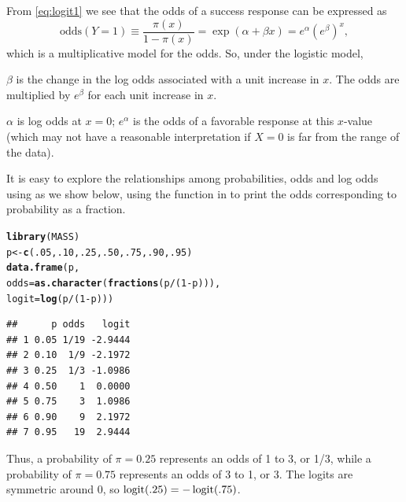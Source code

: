 \documentclass[11pt]{book}\usepackage[]{graphicx}\usepackage[]{color}
\makeatletter
\newcommand{\hlnum}[1]{\textcolor[rgb]{0.686,0.059,0.569}{#1}}%
\newcommand{\hlopt}[1]{\textcolor[rgb]{0,0,0}{#1}}%
\newcommand{\hlstd}[1]{\textcolor[rgb]{0.345,0.345,0.345}{#1}}%
\newcommand{\hlkwb}[1]{\textcolor[rgb]{0.69,0.353,0.396}{#1}}%
\newcommand{\hlkwc}[1]{\textcolor[rgb]{0.333,0.667,0.333}{#1}}%
\newcommand{\hlkwd}[1]{\textcolor[rgb]{0.737,0.353,0.396}{\textbf{#1}}}%
\newenvironment{kframe}{%
 \def\at@end@of@kframe{}%
 \ifinner\ifhmode%
  \def\at@end@of@kframe{\end{minipage}}%
  \begin{minipage}{\columnwidth}%
 \fi\fi%
 \def\FrameCommand##1{\hskip\@totalleftmargin \hskip-\fboxsep
 \colorbox{shadecolor}{##1}\hskip-\fboxsep
     \hskip-\linewidth \hskip-\@totalleftmargin \hskip\columnwidth}%
 \MakeFramed {\advance\hsize-\width
   \@totalleftmargin\z@ \linewidth\hsize
   \@setminipage}}%
 {\par\unskip\endMakeFramed%
 \at@end@of@kframe}
\newenvironment{knitrout}{}{} %
\renewenvironment{knitrout}{\small\renewcommand{\baselinestretch}{.85}}{} %
\makeatother
\begin{document}
From \eqref{eq:logit1} we see that the odds of a success response
can be expressed as
%
\begin{equation}\label{eq:logit2}
\mbox{odds}(Y=1) \equiv \frac{\pi(x) }{1-\pi(x) }  =
\exp (\alpha + \beta x) = e^{\alpha} ( e^{\beta} )^x \comma
\end{equation}
%
which is a multiplicative model for the odds.
So, under the logistic model,
\begin{itemize*}
\item $\beta$ is the change in the log odds associated with a unit
increase in $x$.
The odds are multiplied by $e^{\beta}$ for each unit increase in $x$.
\item $\alpha$ is log odds at $x=0$; $e^{\alpha}$ is the odds of
a favorable response at this $x$-value
(which may not have a reasonable interpretation if $X=0$ is far from
the range of the data).
\end{itemize*}

It is easy to explore the relationships among probabilities, odds and
log odds using \R as we show below, using the function 
in  to print the odds corresponding to probability 
as a fraction.
\begin{knitrout}
\color{fgcolor}\begin{kframe}
\begin{alltt}
\hlkwd{library}\hlstd{(MASS)}
\hlstd{p} \hlkwb{<-} \hlkwd{c}\hlstd{(}\hlnum{.05}\hlstd{,} \hlnum{.10}\hlstd{,} \hlnum{.25}\hlstd{,} \hlnum{.50}\hlstd{,} \hlnum{.75}\hlstd{,} \hlnum{.90}\hlstd{,} \hlnum{.95}\hlstd{)}
\hlkwd{data.frame}\hlstd{(p,}
           \hlkwc{odds}\hlstd{=}\hlkwd{as.character}\hlstd{(}\hlkwd{fractions}\hlstd{(p}\hlopt{/}\hlstd{(}\hlnum{1}\hlopt{-}\hlstd{p))),}
           \hlkwc{logit}\hlstd{=}\hlkwd{log}\hlstd{(p}\hlopt{/}\hlstd{(}\hlnum{1}\hlopt{-}\hlstd{p)))}
\end{alltt}
\begin{verbatim}
##      p odds   logit
## 1 0.05 1/19 -2.9444
## 2 0.10  1/9 -2.1972
## 3 0.25  1/3 -1.0986
## 4 0.50    1  0.0000
## 5 0.75    3  1.0986
## 6 0.90    9  2.1972
## 7 0.95   19  2.9444
\end{verbatim}
\end{kframe}
\end{knitrout}
Thus, a probability of $\pi = 0.25$ represents an odds of 1 to 3, or 1/3,
while a probability of $\pi = 0.75$ represents an odds of 3 to 1, or 3.
The logits are symmetric around 0, so $\logit (.25) = - \logit (.75)$.
\end{document}
